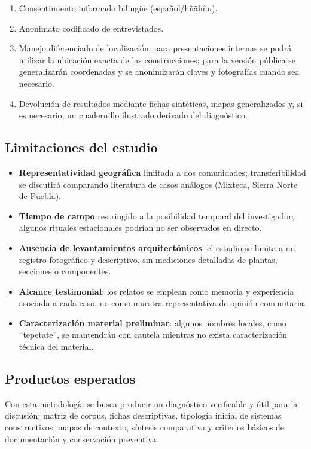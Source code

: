 \begin{enumerate}
	\item Consentimiento informado bilingüe (español/hñähñu).
	\item Anonimato codificado de entrevistados.
	\item Manejo diferenciado de localización: para presentaciones internas se podrá utilizar la ubicación exacta de las construcciones; para la versión pública se generalizarán coordenadas y se anonimizarán claves y fotografías cuando sea necesario.
	\item Devolución de resultados mediante fichas sintéticas, mapas generalizados y, si es necesario, un cuadernillo ilustrado derivado del diagnóstico.
\end{enumerate}

\subsection{Limitaciones del estudio}

\begin{itemize}
	\item \textbf{Representatividad geográfica} limitada a dos comunidades;
	      transferibilidad se discutirá comparando literatura de casos
	      análogos (Mixteca, Sierra Norte de Puebla).
	\item \textbf{Tiempo de campo} restringido a la posibilidad temporal del investigador;
	      algunos rituales estacionales podrían no ser observados en directo.
	\item \textbf{Ausencia de levantamientos arquitectónicos}: el estudio se limita a un registro fotográfico
	      y descriptivo, sin mediciones detalladas de plantas, secciones o componentes.
	\item \textbf{Alcance testimonial}: los relatos se emplean como memoria y experiencia asociada a cada caso, no como muestra representativa de opinión comunitaria.
    \item \textbf{Caracterización material preliminar}: algunos nombres locales, como ``tepetate'', se mantendrán con cautela mientras no exista caracterización técnica del material.
\end{itemize}

\subsection{Productos esperados}

Con esta metodología se busca producir un diagnóstico verificable y útil para la discusión: matriz de corpus, fichas descriptivas, tipología inicial de sistemas constructivos, mapas de contexto, síntesis comparativa y criterios básicos de documentación y conservación preventiva.
